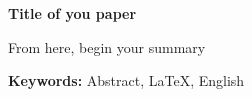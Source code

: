 \begin{center}
\Large\bf Title of you paper
\end{center}

From here, begin your summary

\begin{center}
    \textbf{Keywords:} Abstract, \LaTeX, English
\end{center}